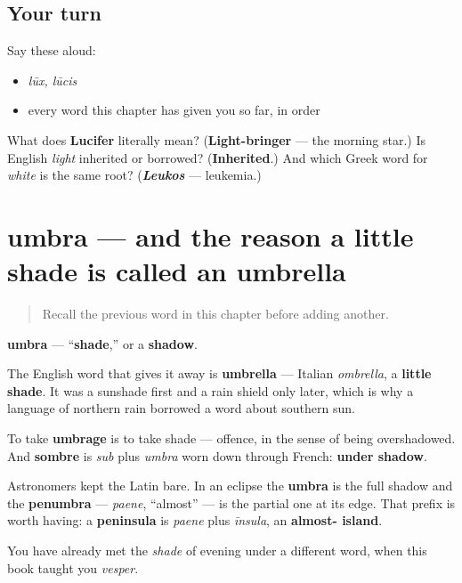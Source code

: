 \subsection*{Your turn}
Say these aloud:

\begin{itemize}
\raggedright
  \item \emph{lūx, lūcis}
  \item every word this chapter has given you so far, in order
\end{itemize}

\begin{tcolorbox}[breakable,colback=teal!4,colframe=teal!35!black,title={Before you move on}]
What does \textbf{Lucifer} literally mean? (\textbf{Light-bringer} — the morning star.) Is English \emph{light} inherited or borrowed? (\textbf{Inherited}.) And which Greek word for \emph{white} is the same root? (\emph{\textbf{Leukos}} — leukemia.)
\end{tcolorbox}
\section[umbra, umbrae]{umbra — and the reason a little shade is called an umbrella}

\label{lesson:LA-C46-umbra}



\begin{quote}
Recall the previous word in this chapter before adding another.
\end{quote}

\begin{cousinweb}
\textbf{umbra} — \textquotedblleft{}\textbf{shade},\textquotedblright{} or a \textbf{shadow}.

The English word that gives it away is \textbf{umbrella} — Italian \emph{ombrella}, a \textbf{little shade}. It was a sunshade first and a rain shield only later, which is why a language of northern rain borrowed a word about southern sun.

To take \textbf{umbrage} is to take shade — offence, in the sense of being overshadowed. And \textbf{sombre} is \emph{sub} plus \emph{umbra} worn down through French: \textbf{under shadow}.

Astronomers kept the Latin bare. In an eclipse the \textbf{umbra} is the full shadow and the \textbf{penumbra} — \emph{paene}, \textquotedblleft{}almost\textquotedblright{} — is the partial one at its edge. That prefix is worth having: a \textbf{peninsula} is \emph{paene} plus \emph{īnsula}, an \textbf{almost- island}.

You have already met the \emph{shade} of evening under a different word, when this book taught you \emph{vesper}.
\end{cousinweb}


